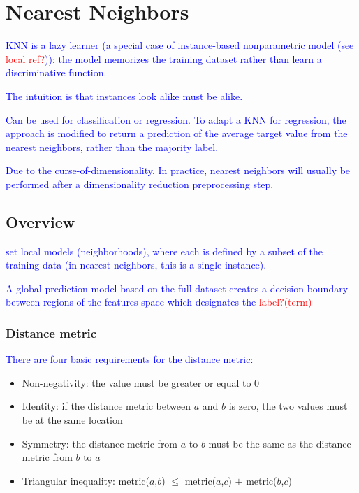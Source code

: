 \section{Nearest Neighbors}

\textcolor{blue}{KNN is a lazy learner (a special case of instance-based nonparametric model (see \textcolor{red}{local ref?})): the model memorizes the training dataset rather than learn a discriminative function.}

\textcolor{blue}{The intuition is that instances look alike must be alike.}

\textcolor{blue}{Can be used for classification or regression. To adapt a KNN for regression, the approach is modified to return a prediction of the average target value from the nearest neighbors, rather than the majority label.}

\textcolor{blue}{Due to the curse-of-dimensionality, In practice, nearest neighbors will usually be performed after a dimensionality reduction preprocessing step.}


\subsection{Overview}



\textcolor{blue}{set local models (neighborhoods), where each is defined by a subset of the training data (in nearest neighbors, this is a single instance).}

\textcolor{blue}{A global prediction model based on the full dataset creates a decision boundary between regions of the features space which designates the \textcolor{red}{label?(term)}}

\subsubsection{Distance metric}

\textcolor{blue}{There are four basic requirements for the distance metric:}

\begin{itemize}
	\item Non-negativity: the value must be greater or equal to 0
	\item Identity: if the distance metric between $a$ and $b$ is zero, the two values must be at the same location
	\item Symmetry: the distance metric from $a$ to $b$ must be the same as the distance metric from $b$ to $a$
	\item Triangular inequality: metric($a$,$b$) $\le$ metric($a$,$c$) $+$ metric($b$,$c$)
\end{itemize}


